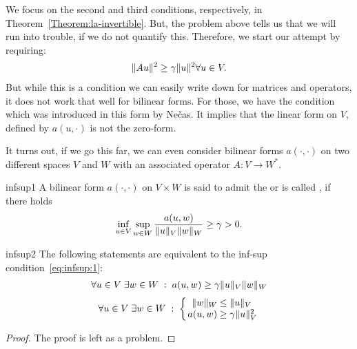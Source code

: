 \begin{intro}
  We focus on the second and third conditions, respectively, in
  Theorem~\ref{Theorem:la-invertible}.
  But, the problem above tells us that we
  will run into trouble, if we do not quantify this. Therefore, we
  start our attempt by requiring:
  \begin{gather*}
    \lVert Au\rVert^2 \ge \gamma \lVert u\rVert^2 \forall u\in V.
  \end{gather*}
  But while this is a condition we can easily write down for matrices
  and operators, it does not work that well for bilinear forms. For
  those, we have the condition which was introduced in this form by
  Nečas. It implies that the linear form on $V$, defined by $a(u,\cdot)$
  is not the zero-form.

  It turns out, if we go this far, we can even consider bilinear forms
  $a(\cdot,\cdot)$ on two different spaces $V$ and $W$ with an associated
  operator $A: V\to W^*$.
\end{intro}

\begin{Definition}{infsup1}
  A bilinear form $a(\cdot,\cdot)$ on $V\times W$ is said to admit the
   or is called , if
  there holds
  \begin{gather}
    \label{eq:infsup:1}
    \inf_{u\in V} \sup_{w\in W} \frac{a(u,w)}{\lVert u\rVert_V\lVert w\rVert_W}
    \ge \gamma > 0.
  \end{gather}
\end{Definition}

\begin{Lemma}{infsup2}
  The following statements are equivalent to the inf-sup
  condition~\eqref{eq:infsup:1}:
  \begin{gather}
    \label{eq:infsup:2}
    \forall u\in V \;\exists w\in W \;:\; a(u,w) \ge \gamma \lVert u\rVert_V\lVert w\rVert_W
  \end{gather}
  \begin{gather}
    \label{eq:infsup:3}
    \forall u\in V
    \;\exists w\in W \;:\;
    \left\{
    \arraycolsep0.3ex
    \begin{array}{rcl}
      \norm{w}_W &\le&\norm{u}_V\\
      a(u,w) &\ge& \gamma \norm{u}_V^2
    \end{array}
    \right.
  \end{gather}
\end{Lemma}

\begin{proof}
  The proof is left as a problem.
\end{proof}

